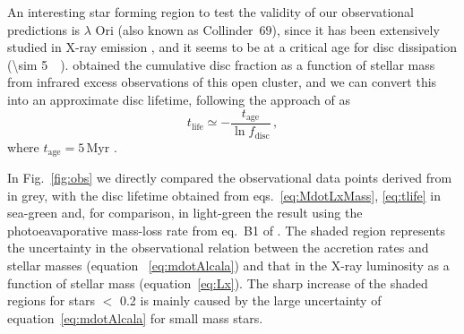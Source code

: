 \documentclass[usenatbib,useAMS,usedcolumn]{mnras}
\begin{document}
An interesting star forming region to test the validity of our observational predictions is $\lambda$ Ori (also known as Collinder~$69$), since it has been extensively studied in X-ray emission , and it seems to be at a critical age for disc dissipation (\SI{\sim 5}{\mega\year}).
 obtained the cumulative disc fraction as a function of stellar mass from infrared excess observations of this open cluster, and we can convert this into an approximate disc lifetime, following the approach of  as
\begin{equation}
    t_\mathrm{life} \simeq -\frac{t_\mathrm{age}}{\ln{f_\mathrm{disc}}}\, ,
\end{equation}
where $t_\mathrm{age} = 5\, \mathrm{Myr}$ .

In Fig.~\ref{fig:obs} we directly compared the observational data points derived from  in grey, with the disc lifetime obtained from eqs.~\ref{eq:MdotLxMass}, \ref{eq:tlife} in sea-green and, for comparison, in light-green the result using the photoeavaporative mass-loss rate from eq.~B1 of . The shaded region represents the uncertainty in the observational relation between the accretion rates and stellar masses (equation~
\ref{eq:mdotAlcala}) and that in the X-ray luminosity as a function of stellar mass (equation~\ref{eq:Lx}). The sharp increase of the shaded regions for stars $<$ \SI{0.2}{\solarmass} is mainly caused by the large uncertainty of equation~\ref{eq:mdotAlcala} for small mass stars.
\end{document}
